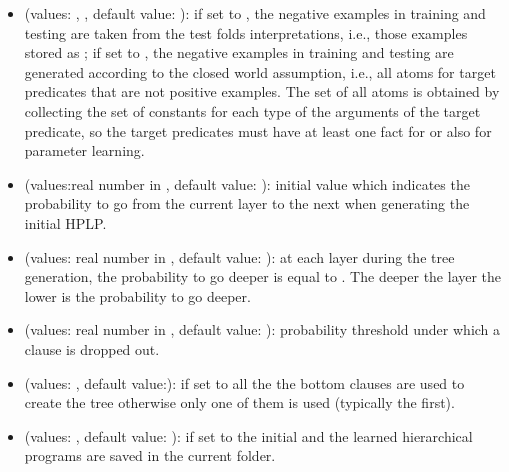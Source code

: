 \documentclass[letterpaper,10pt,english]{sphinxmanual}
\begin{document}
\begin{itemize}
\begin{itemize}
\item {} 
 (values: , , default value: ): if set to , the negative examples in training and testing are taken from the test folds interpretations, i.e., those examples  stored as ; if set to , the negative examples in training and testing are generated according to the closed world assumption, i.e., all atoms for target predicates that are not positive examples. The set of all atoms is obtained by collecting the set of constants for each type of the arguments of the target predicate, so the target predicates must have at least one fact for  or  also for parameter learning.

\item {} 
 (values:real number in \sphinxcode{\sphinxupquote{{[}0,1{]}}} , default value: ): initial value which indicates the probability to go from the current layer to the next when generating the initial HPLP.

\item {} 
 (values: real number in \sphinxcode{\sphinxupquote{{[}0,1{]}}}, default value: ): at each layer during the tree generation, the probability to go deeper is equal to . The deeper the layer the lower is the probability to go deeper.

\item {} 
 (values: real number in \sphinxcode{\sphinxupquote{{[}0,1{]}}}, default value: ):  probability threshold under which a clause is dropped out.

\item {} 
 (values:  , default value:): if set to  all the the bottom clauses are used to create the tree otherwise only one of them is used (typically the first).

\item {} 
 (values: , default value: ): if set to  the initial and the learned hierarchical programs are saved in the current folder.


\end{itemize}
\end{itemize}
\end{document}
